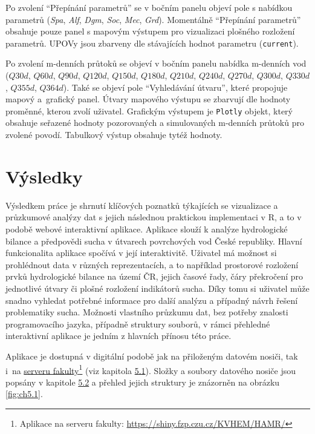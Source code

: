 \documentclass[12pt,]{article}
\let\rmarkdownfootnote\footnote%
\def\footnote{\protect\rmarkdownfootnote}
\begin{document}
\qquad Po zvolení \enquote{Přepínání parametrů} se v bočním panelu
objeví pole s nabídkou parametrů (\emph{Spa}, \emph{Alf}, \emph{Dgm},
\emph{Soc}, \emph{Mec}, \emph{Grd}). Momentálně \enquote{Přepínání
parametrů} obsahuje pouze panel s mapovým výstupem pro vizualizaci
plošného rozložení parametrů. UPOVy jsou zbarveny dle stávajících hodnot
parametru (\texttt{current}).

\qquad Po zvolení m-denních průtoků se objeví v bočním panelu nabídka
m-denních vod (\(Q30d\), \(Q60d\), \(Q90d\), \(Q120d\), \(Q150d\),
\(Q180d\), \(Q210d\), \(Q240d\), \(Q270d\), \(Q300d\), \(Q330d\),
\(Q355d\), \(Q364d\)). Také se objeví pole \enquote{Vyhledávání útvaru},
které propojuje mapový a~grafický panel. Útvary mapového výstupu se
zbarvují dle hodnoty proměnné, kterou zvolí uživatel. Grafickým výstupem
je \texttt{Plotly} objekt, který obsahuje seřazené hodnoty pozorovaných
a simulovaných m-denních průtoků pro zvolené povodí. Tabulkový výstup
obsahuje tytéž hodnoty.

\newpage

\section*{Výsledky}\label{vysledky}

\qquad Výsledkem práce je shrnutí klíčových poznatků týkajících se
vizualizace a průzkumové analýzy dat s jejich následnou praktickou
implementaci v R, a to v podobě webové interaktivní aplikace. Aplikace
slouží k analýze hydrologické bilance a předpovědi sucha v útvarech
povrchových vod České republiky. Hlavní funkcionalita aplikace spočívá v
její interaktivitě. Uživatel má možnost si prohlédnout data v různých
reprezentacích, a to například prostorové rozložení prvků hydrologické
bilance na území ČR, jejich časové řady, čáry překročení pro jednotlivé
útvary či plošné rozložení indikátorů sucha. Díky tomu si uživatel může
snadno vyhledat potřebné informace pro další analýzu a případný návrh
řešení problematiky sucha. Možnosti vlastního průzkumu dat, bez potřeby
znalosti programovacího jazyka, případně struktury souborů, v rámci
přehledné interaktivní aplikace je jedním z hlavních přínosu této práce.

\qquad Aplikace je dostupná v digitální podobě jak na přiloženým datovém
nosiči, tak i~na \href{https://shiny.fzp.czu.cz/KVHEM/HAMR/}{serveru
fakulty}\footnote{Aplikace na serveru fakulty:
  \url{https://shiny.fzp.czu.cz/KVHEM/HAMR/}} (viz kapitola
\protect\hyperlink{techres}{5.1}). Složky a soubory datového nosiče jsou
popsány v kapitole \protect\hyperlink{data}{5.2} a přehled jejich
struktury je znázorněn na obrázku \ref{fig:ch5.1}.
\end{document}
